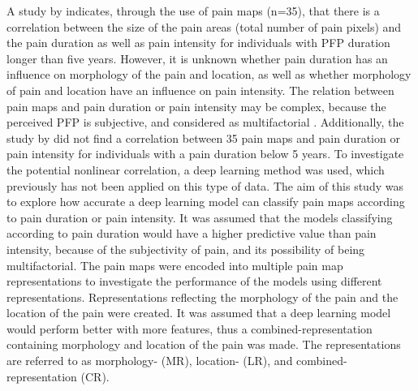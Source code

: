 \noindent
A study by \citeauthor{Boudreau2017} \citep{Boudreau2017} indicates, through the use of pain maps (n=35), that there is a correlation between the size of the pain areas (total number of pain pixels) and the pain duration as well as pain intensity for individuals with PFP duration longer than five years.\citep{Boudreau2017}
However, it is unknown whether pain duration has an influence on morphology of the pain and location, as well as whether morphology of pain and location have an influence on pain intensity.
The relation between pain maps and pain duration or pain intensity may be complex, because the perceived PFP is subjective, and considered as multifactorial \citep{Dansie2013}. Additionally, the study by \citeauthor{Boudreau2017} \citep{Boudreau2017} did not find a correlation between 35 pain maps and pain duration or pain intensity for individuals with a pain duration below 5 years. To investigate the potential nonlinear correlation, a deep learning method was used, which previously has not been applied on this type of data. \newline
\noindent
The aim of this study was to explore how accurate a deep learning model can classify pain maps according to pain duration or pain intensity. It was assumed that the models classifying according to pain duration would have a higher predictive value than pain intensity, because of the subjectivity of pain, and its possibility of being multifactorial. The pain maps were encoded into multiple pain map representations to investigate the performance of the models using different representations. Representations reflecting the morphology of the pain and the location of the pain were created. It was assumed that a deep learning model would perform better with more features, thus a combined-representation containing morphology and location of the pain was made. The representations are referred to as morphology- (MR), location- (LR), and combined-representation (CR).
